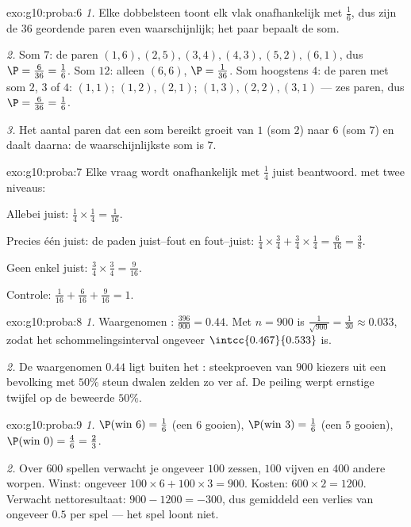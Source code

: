 \begin{solution}{exo:g10:proba:6}
\emph{1.} Elke dobbelsteen toont elk vlak onafhankelijk met  $\frac16$,
dus zijn de $36$ geordende paren even waarschijnlijk; het paar bepaalt de
som.

\emph{2.} Som $7$: de paren $(1,6), (2,5), (3,4), (4,3), (5,2), (6,1)$, dus
$\P = \frac{6}{36} = \frac16$. Som $12$: alleen $(6,6)$,
$\P = \frac{1}{36}$. Som hoogstens $4$: de paren met som $2$, $3$ of $4$:
$(1,1)$; $(1,2), (2,1)$; $(1,3), (2,2), (3,1)$ --- zes paren, dus
$\P = \frac{6}{36} = \frac16$.

\emph{3.} Het aantal paren dat een som bereikt groeit van $1$ (som $2$) naar
$6$ (som $7$) en daalt daarna: de waarschijnlijkste som is $7$.
\end{solution}

\begin{solution}{exo:g10:proba:7}
Elke vraag wordt onafhankelijk met  $\frac14$ juist beantwoord.
 met twee niveaus:

Allebei juist: $\frac14 \times \frac14 = \frac{1}{16}$.

Precies één juist: de paden juist--fout en fout--juist:
$\frac14 \times \frac34 + \frac34 \times \frac14 = \frac{6}{16} = \frac38$.

Geen enkel juist: $\frac34 \times \frac34 = \frac{9}{16}$.

Controle: $\frac{1}{16} + \frac{6}{16} + \frac{9}{16} = 1$.
\end{solution}

\begin{solution}{exo:g10:proba:8}
\emph{1.} Waargenomen : $\frac{396}{900} = 0.44$. Met $n = 900$ is
$\frac{1}{\sqrt{900}} = \frac{1}{30} \approx 0.033$, zodat het
schommelingsinterval ongeveer $\intcc{0.467}{0.533}$ is.

\emph{2.} De waargenomen $0.44$ ligt buiten het : steekproeven van
$900$ kiezers uit een bevolking met $50\%$ steun dwalen zelden zo ver af. De
peiling werpt ernstige twijfel op de beweerde $50\%$.
\end{solution}

\begin{solution}{exo:g10:proba:9}
\emph{1.} $\P(\text{win } 6) = \frac16$ (een $6$ gooien),
$\P(\text{win } 3) = \frac16$ (een $5$ gooien),
$\P(\text{win } 0) = \frac46 = \frac23$.

\emph{2.} Over $600$ spellen verwacht je ongeveer $100$ zessen, $100$
vijven en $400$ andere worpen. Winst: ongeveer
$100 \times 6 + 100 \times 3 = 900$. Kosten: $600 \times 2 = 1200$.
Verwacht nettoresultaat: $900 - 1200 = -300$, dus gemiddeld een verlies van
ongeveer $0.5$ per spel --- het spel loont niet.
\end{solution}

